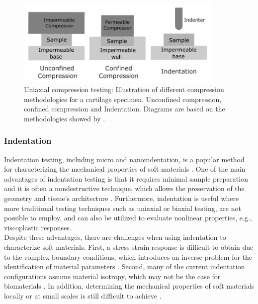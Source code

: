 \begin{figure}%
        \centering
       \quad
       \includegraphics[width=10cm]{Images/chapter1/compressiontypes.png}%
       \caption[Uniaxial compression testing methodologies]{Uniaxial compression testing: Illustration of different compression methodologies for a cartilage specimen. Unconfined compression, confined compression and Indentation. Diagrams are based on the methodologies showed by \citet{Griffin2016}.}%
       \label{fig:compressiontypes}%
\end{figure}

\subsubsection*{Indentation}
Indentation testing, including micro and nanoindentation, is a popular method for characterizing 
the mechanical properties of soft materials \cite{Wu2016}. One of the main advantages of 
indentation testing is that it requires minimal sample preparation and it is often a 
nondestructive technique, which allows the preservation of the geometry and tissue's architecture \cite{Shi2019}.
Furthermore, indentation is useful where more traditional testing techniques such as 
uniaxial or biaxial testing, are not possible to employ, 
and can also be utilized to evaluate nonlinear properties, e.g., viscoplastic responses\cite{Bergström2015}.\\

Despite these advantages, there are challenges when using indentation to 
characterize soft materials. First, a stress-strain response is difficult to
obtain due to the complex boundary conditions, which introduces an inverse problem 
for the identification of material parameters \cite{Shi2019}. Second, many of the current 
indentation configurations assume material isotropy, which may not be the case for biomaterials \cite{Feng2017}.
In addition, determining the mechanical properties of soft materials locally or at small scales is still difficult to achieve \cite{Zhang2014}.


